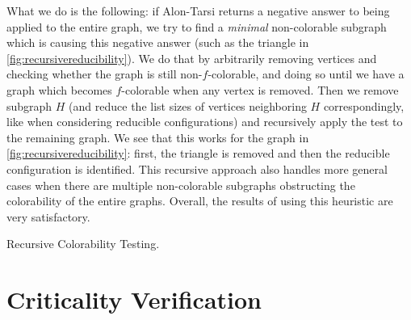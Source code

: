 What we do is the following: if Alon-Tarsi returns a negative answer to being applied to the 
entire graph, we try to find a \emph{minimal} non-colorable subgraph which is causing this 
negative answer (such 
as the triangle in \ref{fig:recursivereducibility}). We do that by arbitrarily removing vertices
and checking whether the graph is still non-$f$-colorable, and doing so until we have a graph
which becomes $f$-colorable when any vertex is removed. Then we remove subgraph $H$ (and reduce
the list sizes of vertices neighboring $H$ correspondingly, like when considering reducible 
configurations) and recursively apply the test to the remaining graph. We see that this works for
the graph in \ref{fig:recursivereducibility}: first, the triangle is removed and then the 
reducible configuration is identified. This recursive approach also handles more general cases
when there are multiple non-colorable subgraphs obstructing the colorability of the entire graphs.
Overall, the results of using this heuristic are very satisfactory. 

\begin{algorithm}[H]
\caption{Recursive Colorability Testing.}
\SetAlgoLined
{}


\end{algorithm}
\section{Criticality Verification}

